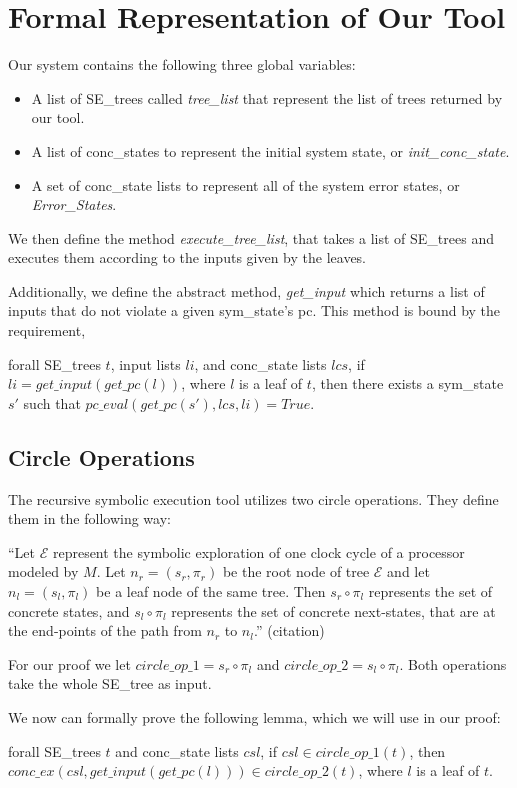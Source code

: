 \section{Formal Representation of Our Tool}
Our system contains the following three global variables:
\begin{itemize}
\item A list of SE\_trees called \textit{tree\_list} that represent the list of trees returned by our tool.
\item A list of conc\_states to represent the initial system state, or \textit{init\_conc\_state}.
\item A set of conc\_state lists to represent all of the system error states, or \textit{Error\_States}.
\end{itemize}

We then define the method \textit{execute\_tree\_list}, that takes a list of SE\_trees and executes them according to the inputs given by the leaves.

Additionally, we define the abstract method, \textit{get\_input} which returns a list of inputs that do not violate a given sym\_state's pc.
This method is bound by the requirement,
\begin{axiom}
forall SE\_trees $t$, input lists $li$, and conc\_state lists $lcs$,  
if $li = get\_input (get\_pc (l)) $, where $l$ is a leaf of $t$,
then there exists a sym\_state $s'$ such that
 $pc\_eval (get\_pc (s'), lcs, li) = True$.
\end{axiom}

\subsection{Circle Operations}
The recursive symbolic execution tool utilizes two circle operations. 
They define them in the following way: 

``Let $\mathcal{E}$ represent the symbolic exploration of one clock cycle of a processor modeled by $M$. Let $n_r = (s_r,\pi_r)$ be the root node of tree $\mathcal{E}$ and let $n_l = (s_l,\pi_l)$ be a leaf node of the same tree. 
Then $s_r \circ \pi_l$ represents the set of concrete states, and $s_l \circ \pi_l$ represents the set of concrete next-states, that are at the end-points of the path from $n_r$ to $n_l$.'' (citation)

For our proof we let $circle\_op\_1 =  s_r \circ \pi_l$ and $circle\_op\_2 =  s_l \circ \pi_l$.
Both operations take the whole SE\_tree as input.

We now can formally prove the following lemma, which we will use in our proof:
\begin{lemma} \label{cop}
forall SE\_trees $t$ and conc\_state lists $csl$,
if $csl \in circle\_op\_1(t)$,
then 
$conc\_ex(csl, get\_input (get\_pc (l))) \in circle\_op\_2(t)$,
where $l$ is a leaf of $t$.
\end{lemma}

